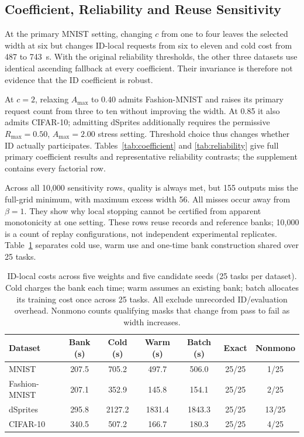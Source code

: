 \documentclass[make,article,submit,pdftex,moreauthors]{Definitions/mdpi}
\begin{document}
\subsection{Coefficient, Reliability and Reuse Sensitivity}\label{sec:idsensitivity}
At the primary MNIST setting, changing $c$ from one to four leaves the
selected width at six but changes ID-local requests from six to eleven
and cold cost from 487 to 743~s. With the original reliability thresholds,
the other three datasets use identical ascending fallback at every
coefficient. Their invariance is therefore not evidence that the ID
coefficient is robust.

At $c=2$, relaxing $A_{\max}$ to 0.40 admits Fashion-MNIST and raises its
primary request count from three to ten without improving the width.
At 0.85 it also admits CIFAR-10; admitting dSprites additionally requires
the permissive $R_{\max}=0.50$, $A_{\max}=2.00$ stress setting.
Threshold choice thus changes whether ID actually participates.
Tables~\ref{tab:coefficient} and \ref{tab:reliability} give full primary
coefficient results and representative reliability contrasts; the
supplement contains every factorial row.

Across all 10,000 sensitivity rows, quality is always met, but 155
outputs miss the full-grid minimum, with maximum excess width 56.
All misses occur away from $\beta=1$. They show why local stopping
cannot be certified from apparent monotonicity at one setting.
These rows reuse records and reference banks; 10,000 is a count of
replay configurations, not independent experimental replicates.
Table~\ref{tab:amortization} separates cold use, warm use and one-time
bank construction shared over 25 tasks.
\begin{table}[H]
\caption{ID-local costs across five weights and five candidate seeds (25 tasks per dataset). Cold charges the bank each time; warm assumes an existing bank; batch allocates its training cost once across 25 tasks. All exclude unrecorded ID/evaluation overhead. Nonmono counts qualifying masks that change from pass to fail as width increases.}\label{tab:amortization}
\small
\setlength{\tabcolsep}{3pt}
\begin{tabular*}{\textwidth}{@{\extracolsep{\fill}}lcccccc@{}}
\toprule
Dataset & Bank (s) & Cold (s) & Warm (s) & Batch (s) & Exact & Nonmono \\
\midrule
MNIST & 207.5 & 705.2 & 497.7 & 506.0 & 25/25 & 1/25 \\
Fashion-MNIST & 207.1 & 352.9 & 145.8 & 154.1 & 25/25 & 2/25 \\
dSprites & 295.8 & 2127.2 & 1831.4 & 1843.3 & 25/25 & 13/25 \\
CIFAR-10 & 340.5 & 507.2 & 166.7 & 180.3 & 25/25 & 4/25 \\
\bottomrule\end{tabular*}
\end{table}
\end{document}
